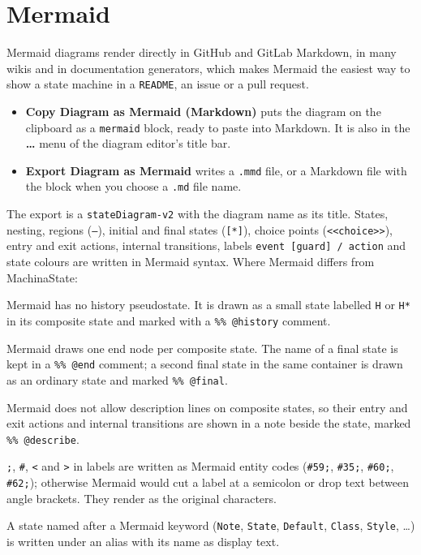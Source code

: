 \documentclass[11pt,a4paper,openany]{report}
\newcommand{\ui}[1]{\textsf{\textbf{#1}}}
\newcommand{\code}[1]{\texttt{#1}}
\begin{document}
\section{Mermaid}
\label{sec:mermaid}
Mermaid diagrams render directly in GitHub and GitLab Markdown, in many wikis and in documentation
generators, which makes Mermaid the easiest way to show a state machine in a \code{README}, an issue or
a pull request.
\begin{itemize}[itemsep=1pt]
  \item \ui{Copy Diagram as Mermaid (Markdown)} puts the diagram on the clipboard as a
        \code{\textasciigrave\textasciigrave\textasciigrave mermaid} block, ready to paste into Markdown. It is also in the \ui{\dots} menu of the
        diagram editor's title bar.
  \item \ui{Export Diagram as Mermaid} writes a \code{.mmd} file, or a Markdown file with the block when
        you choose a \code{.md} file name.
\end{itemize}
The export is a \code{stateDiagram-v2} with the diagram name as its title. States, nesting, regions
(\code{--}), initial and final states (\code{[*]}), choice points (\code{<<choice>>}), entry and exit
actions, internal transitions, labels \code{event [guard] / action} and state colours are written in
Mermaid syntax. Where Mermaid differs from MachinaState:
\begin{description}[style=nextline, itemsep=2pt]
  \item[History] Mermaid has no history pseudostate. It is drawn as a small state labelled \code{H} or
    \code{H*} in its composite state and marked with a \code{\%\% @history} comment.
  \item[Final states] Mermaid draws one end node per composite state. The name of a final state is kept
    in a \code{\%\% @end} comment; a second final state in the same container is drawn as an ordinary
    state and marked \code{\%\% @final}.
  \item[Composite state actions] Mermaid does not allow description lines on composite states, so their
    entry and exit actions and internal transitions are shown in a note beside the state, marked
    \code{\%\% @describe}.
  \item[Special characters] \code{;}, \code{\#}, \code{<} and \code{>} in labels are written as
    Mermaid entity codes (\code{\#59;}, \code{\#35;}, \code{\#60;}, \code{\#62;}); otherwise Mermaid would
    cut a label at a semicolon or drop text between angle brackets. They render as the original characters.
  \item[Reserved names] A state named after a Mermaid keyword (\code{Note}, \code{State}, \code{Default},
    \code{Class}, \code{Style}, \dots) is written under an alias with its name as display text.
\end{description}
\end{document}
